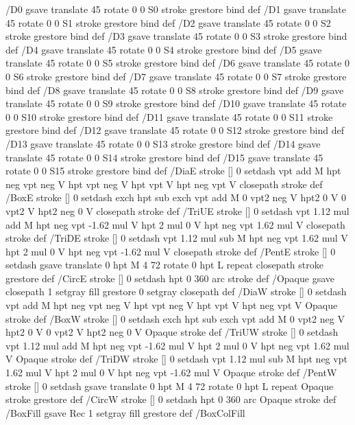 {{/D0 { gsave translate 45 rotate 0 0 S0 stroke grestore } bind def
/D1 { gsave translate 45 rotate 0 0 S1 stroke grestore } bind def
/D2 { gsave translate 45 rotate 0 0 S2 stroke grestore } bind def
/D3 { gsave translate 45 rotate 0 0 S3 stroke grestore } bind def
/D4 { gsave translate 45 rotate 0 0 S4 stroke grestore } bind def
/D5 { gsave translate 45 rotate 0 0 S5 stroke grestore } bind def
/D6 { gsave translate 45 rotate 0 0 S6 stroke grestore } bind def
/D7 { gsave translate 45 rotate 0 0 S7 stroke grestore } bind def
/D8 { gsave translate 45 rotate 0 0 S8 stroke grestore } bind def
/D9 { gsave translate 45 rotate 0 0 S9 stroke grestore } bind def
/D10 { gsave translate 45 rotate 0 0 S10 stroke grestore } bind def
/D11 { gsave translate 45 rotate 0 0 S11 stroke grestore } bind def
/D12 { gsave translate 45 rotate 0 0 S12 stroke grestore } bind def
/D13 { gsave translate 45 rotate 0 0 S13 stroke grestore } bind def
/D14 { gsave translate 45 rotate 0 0 S14 stroke grestore } bind def
/D15 { gsave translate 45 rotate 0 0 S15 stroke grestore } bind def
/DiaE { stroke [] 0 setdash vpt add M
  hpt neg vpt neg V hpt vpt neg V
  hpt vpt V hpt neg vpt V closepath stroke } def
/BoxE { stroke [] 0 setdash exch hpt sub exch vpt add M
  0 vpt2 neg V hpt2 0 V 0 vpt2 V
  hpt2 neg 0 V closepath stroke } def
/TriUE { stroke [] 0 setdash vpt 1.12 mul add M
  hpt neg vpt -1.62 mul V
  hpt 2 mul 0 V
  hpt neg vpt 1.62 mul V closepath stroke } def
/TriDE { stroke [] 0 setdash vpt 1.12 mul sub M
  hpt neg vpt 1.62 mul V
  hpt 2 mul 0 V
  hpt neg vpt -1.62 mul V closepath stroke } def
/PentE { stroke [] 0 setdash gsave
  translate 0 hpt M 4 {72 rotate 0 hpt L} repeat
  closepath stroke grestore } def
/CircE { stroke [] 0 setdash 
  hpt 0 360 arc stroke } def
/Opaque { gsave closepath 1 setgray fill grestore 0 setgray closepath } def
/DiaW { stroke [] 0 setdash vpt add M
  hpt neg vpt neg V hpt vpt neg V
  hpt vpt V hpt neg vpt V Opaque stroke } def
/BoxW { stroke [] 0 setdash exch hpt sub exch vpt add M
  0 vpt2 neg V hpt2 0 V 0 vpt2 V
  hpt2 neg 0 V Opaque stroke } def
/TriUW { stroke [] 0 setdash vpt 1.12 mul add M
  hpt neg vpt -1.62 mul V
  hpt 2 mul 0 V
  hpt neg vpt 1.62 mul V Opaque stroke } def
/TriDW { stroke [] 0 setdash vpt 1.12 mul sub M
  hpt neg vpt 1.62 mul V
  hpt 2 mul 0 V
  hpt neg vpt -1.62 mul V Opaque stroke } def
/PentW { stroke [] 0 setdash gsave
  translate 0 hpt M 4 {72 rotate 0 hpt L} repeat
  Opaque stroke grestore } def
/CircW { stroke [] 0 setdash 
  hpt 0 360 arc Opaque stroke } def
/BoxFill { gsave Rec 1 setgray fill grestore } def
/BoxColFill {
}}}
